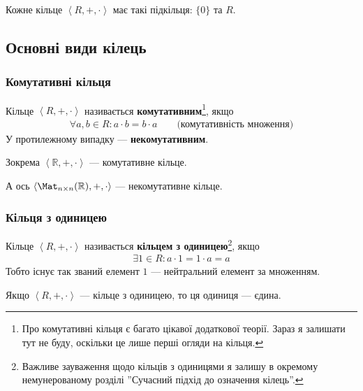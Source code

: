 \documentclass{math_library}
\begin{document}
\begin{remark}
Кожне кільце $\left<R,+,\cdot \right>$ має такі підкільця: $\{0\}$ та $R$.
\end{remark}

\subsection{Основні види кілець}
\subsubsection{Комутативні кільця}
\begin{definition}
Кільце $\left<R,+, \cdot \right>$ називається \textbf{комутативним}\footnote{Про комутативні кільця є багато цікавої додаткової теорії. Зараз я залишати тут не буду, оскільки це лише перші огляди на кільця.}, якщо
\begin{align*}
\forall a,b \in R: a \cdot b = b \cdot a \qquad \text{(комутативність множення)}
\end{align*}
У протилежному випадку --- \textbf{некомутативним}.
\end{definition}

\begin{example}
Зокрема $\left<\mathbb{R},+,\cdot \right>$ --- комутативне кільце.
\end{example}

\begin{example}
А ось $\left< \Mat_{n \times n}(\mathbb{R}), +, \cdot \right>$ --- некомутативне кільце.
\end{example}

\subsubsection{Кільця з одиницею}
\begin{definition}
Кільце $\left<R,+, \cdot \right>$ називається \textbf{кільцем з одиницею}\footnote{Важливе зауваження щодо кільців з одиницями я залишу в окремому немунерованому розділі ''Сучасний підхід до означення кілець''.}, якщо
\begin{align*}
\exists 1 \in R: a \cdot 1 = 1 \cdot a = a
\end{align*}
Тобто існує так званий елемент $1$ --- нейтральний елемент за множенням.
\end{definition}

\begin{proposition}
Якщо $\left<R,+, \cdot \right>$ --- кільце з одиницею, то ця одиниця --- єдина.
\end{proposition}
\end{document}
